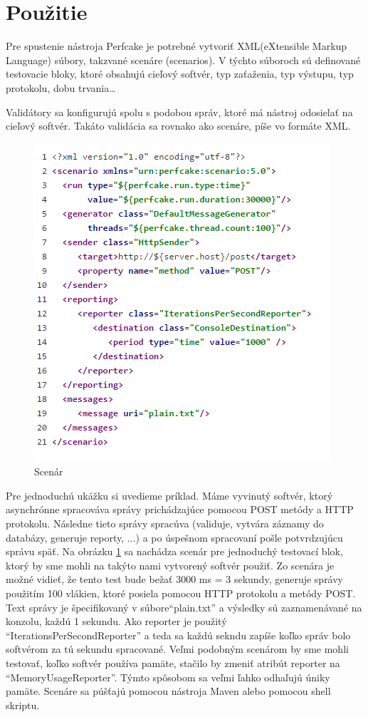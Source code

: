 \section{Použitie}

Pre spustenie nástroja Perfcake je potrebné vytvoriť XML(eXtensible Markup Language) súbory, takzvané scenáre (scenarios). V týchto súboroch sú definované testovacie bloky, ktoré obsahujú cieľový softvér, typ zaťaženia, typ výstupu, typ protokolu, dobu trvania\dots

Validátory sa konfigurujú spolu s podobou správ, ktoré má nástroj odosielať na cieľový softvér. Takáto validácia sa rovnako ako scenáre, píše vo formáte XML.


\begin{figure}[ht]
\includegraphics[scale=1]{scenario.png}
\caption{Scenár}\label{scenario}
\end{figure}


Pre jednoduchú ukážku si uvedieme príklad. Máme vyvinutý softvér, ktorý asynchrónne spracováva správy prichádzajúce pomocou POST metódy a HTTP protokolu. Následne tieto správy spracúva (validuje, vytvára záznamy do databázy, generuje reporty, ...) a po úspešnom spracovaní pošle potvrdzujúcu správu späť.
Na obrázku \ref{scenario} sa nachádza scenár pre jednoduchý testovací blok, ktorý by sme mohli na takýto nami vytvorený softvér použiť. Zo scenára je možné vidieť, že tento test bude bežať 3000 ms = 3 sekundy, generuje správy použitím 100 vlákien, ktoré posiela pomocou HTTP protokolu a metódy POST. Text správy je špecifikovaný v súbore``plain.txt'' a výsledky sú zaznamenávané na konzolu, každú 1 sekundu. Ako reporter je použitý ``IterationsPerSecondReporter'' a teda sa každú sekndu zapíše koľko správ bolo softvérom za tú sekundu spracované. Veľmi podobným scenárom by sme mohli testovať, koľko softvér používa pamäte, stačilo by zmeniť atribút reporter na ``MemoryUsageReporter''. Týmto spôsobom sa veľmi ľahko odhaľujú úniky pamäte. Scenáre sa púšťajú pomocou nástroja Maven alebo pomocou shell skriptu.


